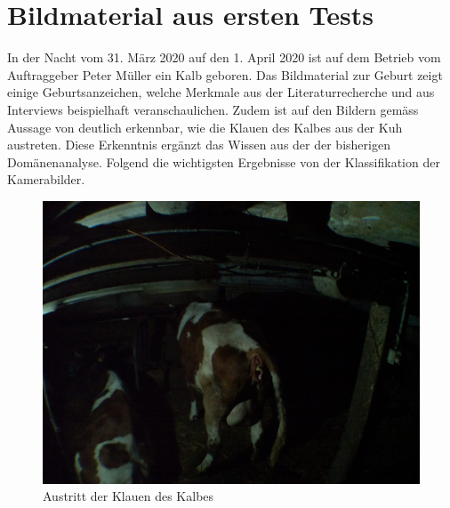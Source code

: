 
\section{Bildmaterial aus ersten Tests}

In der Nacht vom 31. März 2020 auf den 1. April 2020 ist auf dem Betrieb vom Auftraggeber Peter Müller ein Kalb geboren. Das Bildmaterial zur Geburt zeigt einige Geburtsanzeichen, welche Merkmale aus der Literaturrecherche und aus Interviews beispielhaft veranschaulichen. Zudem ist auf den Bildern gemäss Aussage von \citep{Muller2020a} deutlich erkennbar, wie die Klauen des Kalbes aus der Kuh austreten. Diese Erkenntnis ergänzt das Wissen aus der der bisherigen Domänenanalyse. Folgend die wichtigsten Ergebnisse von der Klassifikation der Kamerabilder. \\





\begin{figure}[h]
	\center
	\includegraphics[scale=0.075]{Grafiken/austrittklauen.jpg}
	\caption{Austritt der Klauen des Kalbes \citep{Muller2020a}} 
	\label{fig: Austritt der Klauen des Kalbes}
\end{figure}


